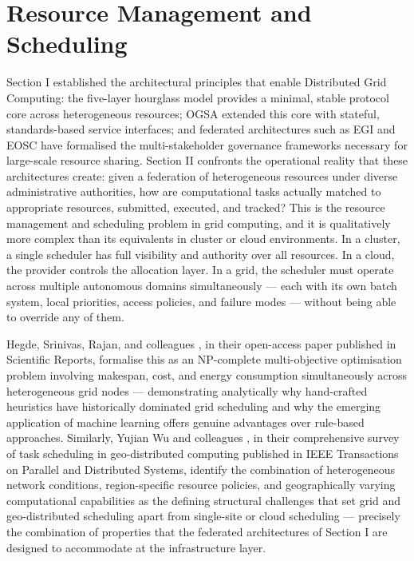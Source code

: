 \documentclass[12pt,a4paper]{report}
\begin{document}
\section*{Resource Management and Scheduling}
Section I established the architectural principles that enable Distributed Grid Computing: the five-layer hourglass model provides a minimal, 
stable protocol core across heterogeneous resources; OGSA extended this core with stateful, standards-based service interfaces; and federated
 architectures such as EGI and EOSC have formalised the multi-stakeholder governance frameworks necessary for large-scale resource sharing. 
 Section II confronts the operational reality that these architectures create: given a federation of heterogeneous resources under diverse 
 administrative authorities, how are computational tasks actually matched to appropriate resources, submitted, executed, and tracked? This
  is the resource management and scheduling problem in grid computing, and it is qualitatively more complex than its equivalents in cluster 
  or cloud environments. In a cluster, a single scheduler has full visibility and authority over all resources. In a cloud, the provider
   controls the allocation layer. In a grid, the scheduler must operate across multiple autonomous domains simultaneously — each with its 
   own batch system, local priorities, access policies, and failure modes — without being able to override any of them. 
   
   Hegde, Srinivas, Rajan, and colleagues \parencite{hegde2024}, in their open-access paper published in Scientific Reports, formalise this as an NP-complete multi-objective
    optimisation problem involving makespan, cost, and energy consumption simultaneously across heterogeneous grid nodes — demonstrating
     analytically why hand-crafted heuristics have historically dominated grid scheduling and why the emerging application of machine 
     learning offers genuine advantages over rule-based approaches. Similarly, Yujian Wu and colleagues \parencite{wu2025task}, in their comprehensive survey of
      task scheduling in geo-distributed computing published in IEEE Transactions on Parallel and Distributed Systems, identify the combination
       of heterogeneous network conditions, region-specific resource policies, and geographically varying computational capabilities as the defining 
       structural challenges that set grid and geo-distributed scheduling apart from single-site or cloud scheduling — precisely the combination 
       of properties that the federated architectures of Section I are designed to accommodate at the infrastructure layer.
\end{document}
